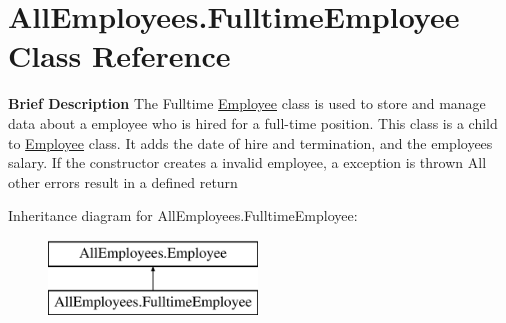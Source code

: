 \hypertarget{class_all_employees_1_1_fulltime_employee}{}\section{All\+Employees.\+Fulltime\+Employee Class Reference}
\label{class_all_employees_1_1_fulltime_employee}


{\bfseries Brief Description} The Fulltime \hyperlink{class_all_employees_1_1_employee}{Employee} class is used to store and manage data about a employee who is hired for a full-\/time position. This class is a child to \hyperlink{class_all_employees_1_1_employee}{Employee} class. It adds the date of hire and termination, and the employees salary. If the constructor creates a invalid employee, a exception is thrown All other errors result in a defined return  


Inheritance diagram for All\+Employees.\+Fulltime\+Employee\+:\begin{figure}[H]
\begin{center}
\leavevmode
\includegraphics[height=2.000000cm]{class_all_employees_1_1_fulltime_employee}
\end{center}
\end{figure}
